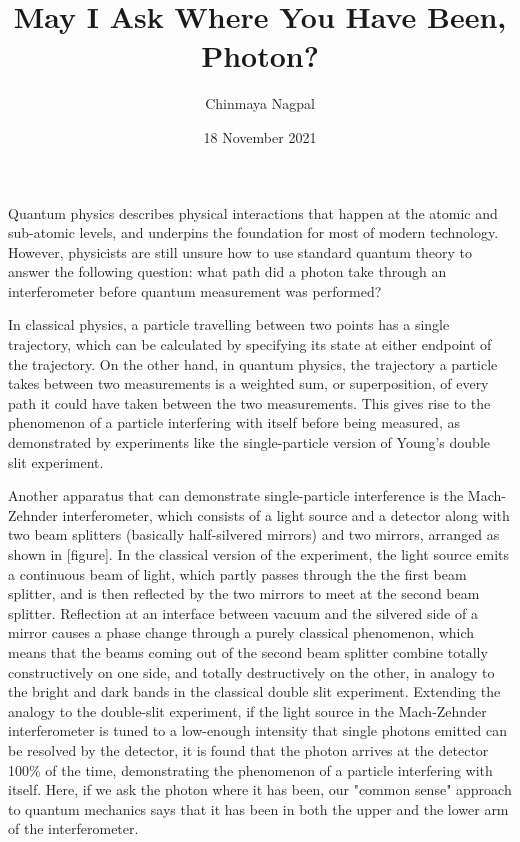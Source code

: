 \documentclass{article}
\author{Chinmaya Nagpal}
\title{May I Ask Where You Have Been, Photon?}
\date{18 November 2021}
\begin{document}
\maketitle

Quantum physics describes physical interactions that happen at the atomic and
sub-atomic levels, and underpins the foundation for most of modern technology.
However, physicists are still unsure how to use standard quantum theory to 
answer the following question: what path did a photon take through an 
interferometer before quantum measurement was performed? 

In classical physics, a particle travelling between two points has a single
trajectory, which can be calculated by specifying its state at either endpoint
of the trajectory. On the other hand, in quantum physics, the trajectory a
particle takes between two measurements is a weighted sum, or superposition, of
every path it could have taken between the two measurements. This gives rise to
the phenomenon of a particle interfering with itself before being measured, as
demonstrated by experiments like the single-particle version of Young's double
slit experiment. 

Another apparatus that can demonstrate single-particle interference is the
Mach-Zehnder interferometer, which consists of a light source and a detector 
along with two beam splitters (basically half-silvered mirrors) and two 
mirrors, arranged as shown in [figure]. In the classical version of the 
experiment, the light source emits a continuous beam of light, which partly 
passes through the the first beam splitter, and is then reflected by the two 
mirrors to meet at the second beam splitter. Reflection at an interface between 
vacuum and the silvered side of a mirror causes a phase change through a purely 
classical phenomenon, which means that the beams coming out of the second beam 
splitter combine totally constructively on one side, and totally destructively 
on the other, in analogy to the bright and dark bands in the classical double 
slit experiment. Extending the analogy to the double-slit experiment, if the 
light source in the Mach-Zehnder interferometer is tuned to a low-enough 
intensity that single photons emitted can be resolved by the detector, it is 
found that the photon arrives at the detector 100\% of the time, demonstrating 
the phenomenon of a particle interfering with itself. Here, if we ask the 
photon where it has been, our "common sense" approach to quantum mechanics says 
that it has been in both the upper and the lower arm of the interferometer.
\end{document}
